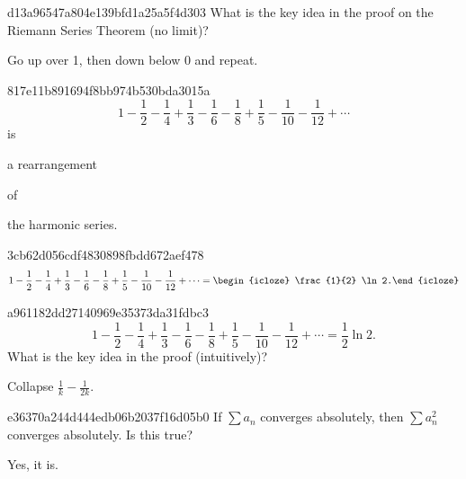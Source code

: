 \begin{note}{d13a96547a804e139bfd1a25a5f4d303}
    What is the key idea in the proof on the Riemann Series Theorem (no limit)?

    \begin{cloze}{1}
        Go up over 1, then down below 0 and repeat.
    \end{cloze}
\end{note}

\begin{note}{817e11b891694f8bb974b530bda3015a}
    \[
        1 - \frac{1}{2} - \frac{1}{4} + \frac{1}{3} - \frac{1}{6} - \frac{1}{8} + \frac{1}{5} - \frac{1}{10} - \frac{1}{12} + \cdots
    \]
    is \begin{icloze}{2}a rearrangement\end{icloze} of \begin{icloze}{1}the harmonic series.\end{icloze}
\end{note}

\begin{note}{3cb62d056cdf4830898fbdd672aef478}
    \[
        1 - \frac{1}{2} - \frac{1}{4} + \frac{1}{3} - \frac{1}{6} - \frac{1}{8} + \frac{1}{5} - \frac{1}{10} - \frac{1}{12} + \cdots = \begin{icloze}{1}\frac{1}{2} \ln 2.\end{icloze}
    \]
\end{note}

\begin{note}{a961182dd27140969e35373da31fdbc3}
    \[
        1 - \frac{1}{2} - \frac{1}{4} + \frac{1}{3} - \frac{1}{6} - \frac{1}{8} + \frac{1}{5} - \frac{1}{10} - \frac{1}{12} + \cdots = \frac{1}{2} \ln 2.
    \]
    What is the key idea in the proof (intuitively)?

    \begin{cloze}{1}
        Collapse \({ \frac{1}{k} - \frac{1}{2k} }\).
    \end{cloze}
\end{note}

\begin{note}{e36370a244d444edb06b2037f16d05b0}
    If \({ \sum a_n }\) converges absolutely, then \({ \sum a_n^2 }\) converges absolutely.
    Is this true?

    \begin{cloze}{1}
        Yes, it is.
    \end{cloze}
\end{note}

